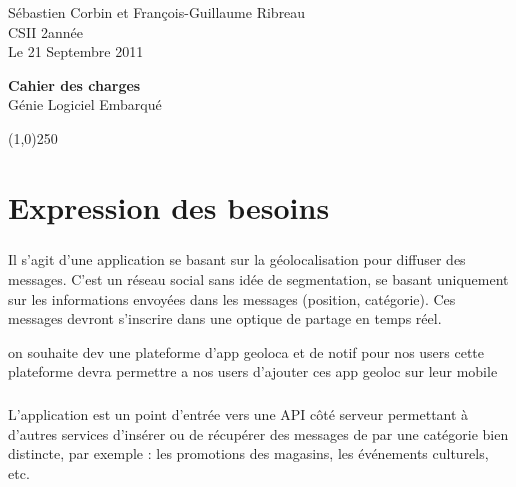 \documentclass[a4paper,12pt]{report}
\begin{document}
  \begin{onehalfspace}

    \begin{titlepage}
      \begin{center}
        Sébastien Corbin et François-Guillaume Ribreau\\
        CSII 2\ieme année\\
        Le 21 Septembre 2011\\
      \end{center}
      \hrulefill
      \vspace{7cm}
      \begin{center}
        \LARGE \textbf{Cahier des charges}\\
        \vspace{3cm}
        \normalsize Génie Logiciel Embarqué
      \end{center}

      \vspace{9,5cm}

      \begin{center}
      \line(1,0){250}
      \end{center}

      \begin{center}
      \tiny{\currfilename}
      \end{center}


    \end{titlepage}
    \clearpage

  \thispagestyle{empty}
  \setcounter{page}{0}
  \clearpage

  \chapter*{Expression des besoins}
  \paragraph*{}
  Il s'agit d'une application se basant sur la géolocalisation pour diffuser des messages. C'est un réseau social sans idée de segmentation, se basant uniquement sur les informations envoyées dans les messages (position, catégorie). Ces messages devront s'inscrire dans une optique de partage en temps réel.

  on souhaite dev une plateforme d'app geoloca et de notif pour nos users
  cette plateforme devra permettre a nos users d'ajouter ces app geoloc sur leur mobile

  \paragraph*{}
  L'application est un point d'entrée vers une API côté serveur permettant à d'autres services d'insérer ou de récupérer des messages de par une catégorie bien distincte, par exemple : les promotions des magasins, les événements culturels, etc.


\end{onehalfspace}
\end{document}
